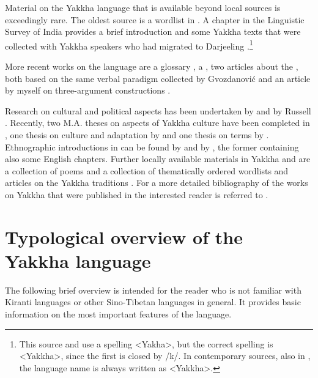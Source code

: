 Material on the Yakkha language that is available beyond local sources is exceedingly rare. The oldest source is a wordlist in \citet{Hodgson1857_Comparative}. A chapter in the Linguistic Survey of India provides a brief introduction and some Yakkha texts that were collected with Yakkha speakers who had migrated to Darjeeling \citep[305--315]{Grierson1909Linguistic}.\footnote{This source and \citet{Russell1992_Yakha} use a spelling <Yakha>, but the correct spelling is <Yakkha>, since the first  is closed by /k/. In contemporary sources, also  in , the language name is always written as <Yakkha>.} 

More recent works on the language are a  glossary \citep{Winter1996Glossary}, a   \citep{Kongren2007Yakkha}, two articles about the , both based on the same verbal paradigm collected by Gvozdanović \citep{Gvozdanovic1987How, Driem1994The-Yakkha} and an article by myself on three-argument constructions \citep{Schackow2012_Referential}.

Research on cultural and political aspects has been undertaken by \citet{Subba1999Politics} and by Russell \citep{Russell1992_Yakha, Russell1997Identity, Russell2000_Missing, Russell2004Traditions, Russell2007Writing, Russell2010_Perceptions}. Recently, two M.A. theses on aspects of Yakkha culture have been completed in , one thesis on culture and adaptation by \citet{Rai2011_Nature}  and one thesis on  terms by  \citet{Linkha2013_kinship}. Ethnographic introductions in  can be found by \citet{Kongren2007Indigenous} and by \citet{Linkha2067Yakkha}, the former containing also some English chapters. Further locally available materials in Yakkha and  are a collection of poems \citep{Dewan2001Opchyongme} and a  collection of thematically ordered wordlists and articles on the Yakkha traditions \citep{Linkha2005Yakkha}. For a more detailed bibliography of the works on Yakkha that were published in  the interested reader is referred to \cite{Rapachaetal2008Indo}. 

 

\section{Typological overview of the Yakkha language}\label{overview-yakkha}
\largerpage
The following brief overview is intended for the reader who is not familiar with Kiranti languages or other Sino-Tibetan languages in general. It provides basic information on the most important features of the language.

